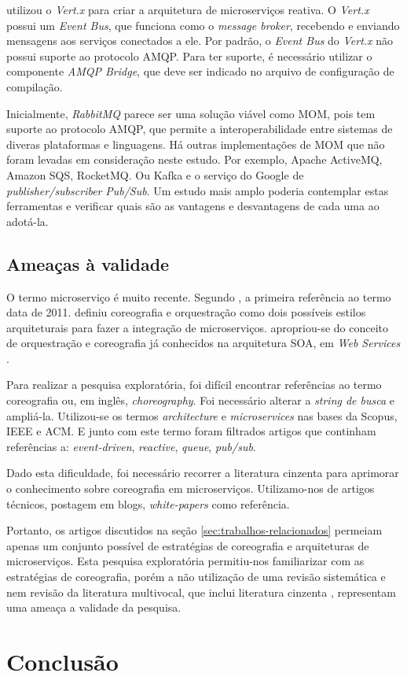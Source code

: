 \documentclass[12pt]{article}
\theoremstyle{plain}
\begin{document}
\cite{Abdelouahed:2018} utilizou o \textit{Vert.x} para criar a arquitetura de microserviços reativa. O \textit{Vert.x} possui um \textit{Event Bus}, que funciona como o \textit{message broker}, recebendo e enviando mensagens aos serviços conectados a ele. Por padrão, o \textit{Event Bus} do \textit{Vert.x} não possui suporte ao protocolo AMQP. Para ter suporte, é necessário utilizar o componente \textit{AMQP Bridge}, que deve ser indicado no arquivo de configuração de compilação.

Inicialmente, \textit{RabbitMQ} parece ser uma solução viável como MOM, pois tem suporte ao protocolo AMQP, que permite a interoperabilidade entre sistemas de diveras plataformas e linguagens. Há outras implementações de MOM que não foram levadas em consideração neste estudo. Por exemplo, Apache ActiveMQ, Amazon SQS, RocketMQ. Ou Kafka e o serviço do Google de \textit{publisher/subscriber} \textit{Pub/Sub}. Um estudo mais amplo poderia contemplar estas ferramentas e verificar quais são as vantagens e desvantagens de cada uma ao adotá-la.

\subsection{Ameaças à validade}

O termo microserviço é muito recente. Segundo \cite{Dragoni2017}, a primeira referência ao termo data de 2011. \cite{Newman:15} definiu coreografia e orquestração como dois possíveis estilos arquiteturais para fazer a integração de microserviços. \cite{Newman:15} apropriou-se do conceito de orquestração e coreografia já conhecidos na arquitetura SOA, em \textit{Web Services} \cite{Peltz:2003}. 

Para realizar a pesquisa exploratória, foi difícil encontrar referências ao termo coreografia ou, em inglês, \textit{choreography}. Foi necessário alterar a \textit{string de busca} e ampliá-la. Utilizou-se os termos \textit{architecture} e \textit{microservices} nas bases da Scopus, IEEE e ACM. E junto com este termo foram filtrados artigos que continham referências a: \textit{event-driven}, \textit{reactive}, \textit{queue}, \textit{pub/sub}.

Dado esta dificuldade, foi necessário recorrer a literatura cinzenta \cite{botelho:2017} para aprimorar o conhecimento sobre coreografia em microserviços. Utilizamo-nos de artigos técnicos, postagem em blogs, \textit{white-papers} como referência. 

Portanto, os artigos discutidos na seção \ref{sec:trabalhos-relacionados} permeiam apenas um conjunto possível de estratégias de coreografia e arquiteturas de microserviços. Esta pesquisa exploratória permitiu-nos familiarizar com as estratégias de coreografia, porém a não utilização de uma revisão sistemática e nem revisão da literatura multivocal, que inclui literatura cinzenta \cite{GAROUSI2018}, representam uma ameaça a validade da pesquisa.

\section{Conclusão}
\label{sec:conclusao}






\end{document}
